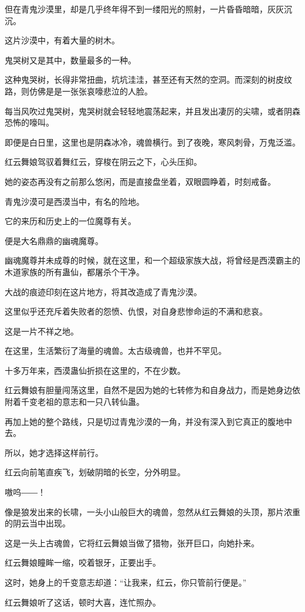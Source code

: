 \begin{this_body}
但在青鬼沙漠里，却是几乎终年得不到一缕阳光的照射，一片昏昏暗暗，灰灰沉沉。

这片沙漠中，有着大量的树木。

鬼哭树又是其中，数量最多的一种。

这种鬼哭树，长得非常扭曲，坑坑洼洼，甚至还有天然的空洞。而深刻的树皮纹路，则仿佛是是一张张哀嚎悲泣的人脸。

每当风吹过鬼哭树，鬼哭树就会轻轻地震荡起来，并且发出凄厉的尖啸，或者阴森恐怖的嚎叫。

即便是白日里，这里也是阴森冰冷，魂兽横行。到了夜晚，寒风刺骨，万鬼泛滥。

红云舞娘驾驭着舞红云，穿梭在阴云之下，心头压抑。

她的姿态再没有之前那么悠闲，而是直接盘坐着，双眼圆睁着，时刻戒备。

青鬼沙漠可是西漠当中，有名的险地。

它的来历和历史上的一位魔尊有关。

便是大名鼎鼎的幽魂魔尊。

幽魂魔尊并未成尊的时候，就在这里，和一个超级家族大战，将曾经是西漠霸主的木道家族的所有蛊仙，都屠杀个干净。

大战的痕迹印刻在这片地方，将其改造成了青鬼沙漠。

这里似乎还充斥着失败者的怨愤、仇恨，对自身悲惨命运的不满和悲哀。

这是一片不祥之地。

在这里，生活繁衍了海量的魂兽。太古级魂兽，也并不罕见。

十多万年来，西漠蛊仙折损在这里的，不在少数。

红云舞娘有胆量闯荡这里，自然不是因为她的七转修为和自身战力，而是她身边依附着千变老祖的意志和一只八转仙蛊。

再加上她的整个路线，只是切过青鬼沙漠的一角，并没有深入到它真正的腹地中去。

所以，她才选择这样前行。

红云向前笔直疾飞，划破阴暗的长空，分外明显。

嗷呜――！

像是狼发出来的长啸，一头小山般巨大的魂兽，忽然从红云舞娘的头顶，那片浓重的阴云当中出现。

这是一头上古魂兽，它将红云舞娘当做了猎物，张开巨口，向她扑来。

红云舞娘瞳眸一缩，咬着银牙，正要出手。

这时，她身上的千变意志却道：“让我来，红云，你只管前行便是。”

红云舞娘听了这话，顿时大喜，连忙照办。


\end{this_body}
